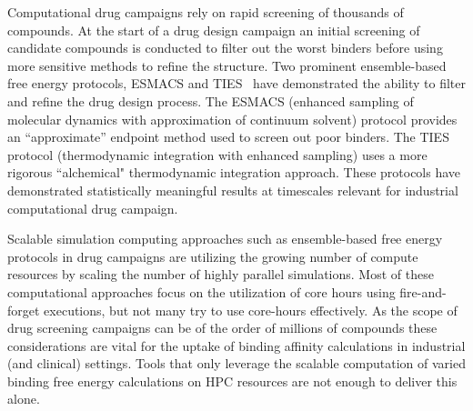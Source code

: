 
Computational drug campaigns rely on rapid screening of thousands of compounds. 
At the start of a drug design campaign an initial screening of candidate 
compounds is conducted to filter out the worst binders before using more 
sensitive methods to refine the structure. 
Two prominent ensemble-based free energy protocols, ESMACS and TIES~\cite{Bhati2017} 
have demonstrated the ability to filter and refine the drug design process. 
The ESMACS (enhanced sampling of molecular dynamics with approximation of continuum 
solvent) protocol provides an ``approximate'' endpoint method used to screen out 
poor binders. 
The TIES protocol (thermodynamic integration with enhanced sampling) uses a more 
rigorous ``alchemical" thermodynamic integration approach. 
These protocols have demonstrated statistically meaningful results at timescales 
relevant for industrial computational drug campaign. 


Scalable simulation computing approaches such as ensemble-based free energy 
protocols in drug campaigns are utilizing the growing number of compute 
resources by scaling the number of highly parallel simulations. 
Most of these computational approaches focus on the utilization of core hours 
using fire-and-forget executions, but not many try to use core-hours effectively. 
As the scope of drug screening campaigns can be of the order of millions of compounds 
these considerations are vital for the uptake of binding affinity calculations in 
industrial (and clinical) settings.
Tools that only leverage the scalable computation of varied binding free energy 
calculations on HPC resources are not enough to deliver this alone.




